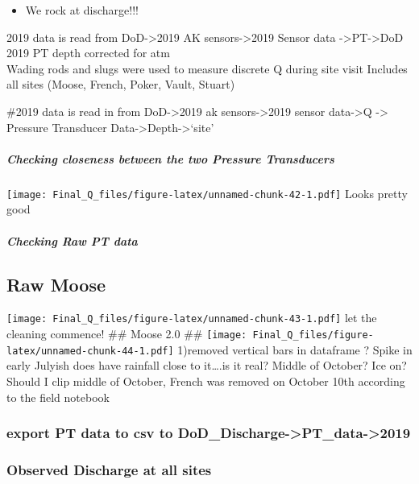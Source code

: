 \documentclass[
]{article}
\providecommand{\tightlist}{%
  \setlength{\itemsep}{0pt}\setlength{\parskip}{0pt}}
\begin{document}
\begin{itemize}
\tightlist
\item
  We rock at discharge!!!
\end{itemize}

2019 data is read from DoD-\textgreater2019 AK sensors-\textgreater2019
Sensor data -\textgreater PT-\textgreater DoD 2019 PT depth corrected
for atm\\
Wading rods and slugs were used to measure discrete Q during site visit
Includes all sites (Moose, French, Poker, Vault, Stuart)

\#2019 data is read in from DoD-\textgreater2019 ak
sensors-\textgreater2019 sensor data-\textgreater Q -\textgreater{}
Pressure Transducer Data-\textgreater Depth-\textgreater{}`site'

\hypertarget{checking-closeness-between-the-two-pressure-transducers-1}{%
\subparagraph{Checking closeness between the two Pressure
Transducers}\label{checking-closeness-between-the-two-pressure-transducers-1}}

\texttt{[image: Final\_Q\_files/figure-latex/unnamed-chunk-42-1.pdf]}
Looks pretty good

\hypertarget{checking-raw-pt-data-1}{%
\subparagraph{Checking Raw PT data}\label{checking-raw-pt-data-1}}

\hypertarget{raw-moose-2}{%
\subsection{Raw Moose}\label{raw-moose-2}}

\texttt{[image: Final\_Q\_files/figure-latex/unnamed-chunk-43-1.pdf]} let
the cleaning commence! \#\# Moose 2.0 \#\#
\texttt{[image: Final\_Q\_files/figure-latex/unnamed-chunk-44-1.pdf]}
1)removed vertical bars in dataframe ? Spike in early Julyish does have
rainfall close to it\ldots.is it real? Middle of October? Ice on? Should
I clip middle of October, French was removed on October 10th according
to the field notebook

\hypertarget{export-pt-data-to-csv-to-dod_discharge-pt_data-2019}{%
\subsubsection{export PT data to csv to
DoD\_Discharge-\textgreater PT\_data-\textgreater2019}\label{export-pt-data-to-csv-to-dod_discharge-pt_data-2019}}

\hypertarget{observed-discharge-at-all-sites}{%
\subsubsection{Observed Discharge at all
sites}\label{observed-discharge-at-all-sites}}
\end{document}
